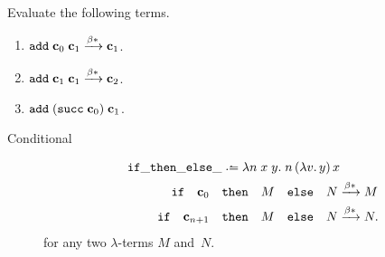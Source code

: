 \begin{example}
  Evaluate the following terms.
  \begin{enumerate}
    \item $\mathtt{add}\;\mathbf{c}_{0}\;\mathbf{c}_{1}
      \xrightarrow{\beta*} \mathbf{c}_{1}$.
    \item $\mathtt{add}\;\mathbf{c}_{1}\;\mathbf{c}_{1}
      \xrightarrow{\beta*} \mathbf{c}_{2}$.
    \item $\mathtt{add}\;(\mathtt{succ}\;\mathbf{c}_{0})\;\mathbf{c}_{1}$.
    \end{enumerate}
\end{example}

\begin{description}
  \item[Conditional]
    \begin{align*}
      \mathtt{if}\_\mathtt{then}\_\mathtt{else}\_
      & \defeq \lambda n\;x\;y.\;n\,(\lambda v.\,y)\,x  \\
      \mathtt{if} \quad\bc_{0}\quad & \mathtt{then}\quad M\quad\mathtt{else}\quad
      N  \reduce M \\
      \mathtt{if} \quad\bc_{n+1}\quad &\mathtt{then}\quad M\quad\mathtt{else}\quad
      N \reduce N.
    \end{align*}
    for any two $\lambda$-terms $M$ and~$N$.
\end{description}

